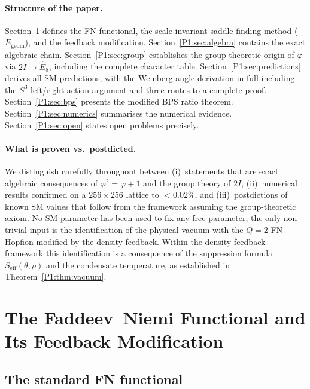 \documentclass[11pt,a4paper]{article}
\theoremstyle{definition}
\theoremstyle{remark}
\newcommand{\vp}{\varphi}
\begin{document}
\paragraph{Structure of the paper.}
Section~\ref{P1:sec:fn} defines the FN functional, the scale-invariant
saddle-finding method ($E_{\mathrm{geom}}$), and the feedback modification.
Section~\ref{P1:sec:algebra} contains the exact algebraic chain.
Section~\ref{P1:sec:group} establishes the group-theoretic origin of $\vp$
via $2I\to\hat{E}_8$, including the complete character table.
Section~\ref{P1:sec:predictions} derives all SM predictions, with the
Weinberg angle derivation in full including the $S^3$ left/right action
argument and three routes to a complete proof.
Section~\ref{P1:sec:bps} presents the modified BPS ratio theorem.
Section~\ref{P1:sec:numerics} summarises the numerical evidence.
Section~\ref{P1:sec:open} states open problems precisely.

\paragraph{What is proven vs.\ postdicted.}
We distinguish carefully throughout between
(i)~statements that are exact algebraic consequences of $\vp^{2}=\vp+1$
and the group theory of $2I$,
(ii)~numerical results confirmed on a $256\times256$ lattice to $<0.02\%$,
and
(iii)~postdictions of known SM values that follow from the framework
assuming the group-theoretic axiom.
No SM parameter has been used to fix any free parameter; the only
non-trivial input is the identification of the physical vacuum with the
$Q=2$ FN Hopfion modified by the density feedback.  Within the density-feedback
framework this identification is a consequence of the suppression formula
$S_{\mathrm{eff}}(\theta,\rho)$ and the condensate temperature, as established
in Theorem~\ref{P1:thm:vacuum}.

\section{The Faddeev--Niemi Functional and Its Feedback Modification}
\label{P1:sec:fn}

\subsection{The standard FN functional}
\end{document}
